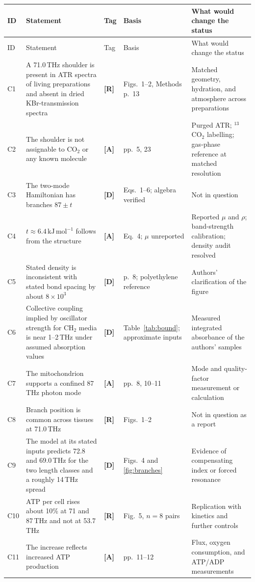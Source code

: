 \documentclass[11pt]{article}
\newcommand{\stR}{\textbf{\textcolor{blue!55!black}{[R]}}}
\newcommand{\stA}{\textbf{\textcolor{orange!70!black}{[A]}}}
\newcommand{\stD}{\textbf{\textcolor{green!40!black}{[D]}}}
\newcommand{\kjm}{\,\mathrm{kJ\,mol^{-1}}}
\theoremstyle{plain}
\theoremstyle{definition}
\theoremstyle{remark}
\begin{document}
\begingroup
\small
\begin{longtable}{@{}p{0.5cm}p{4.6cm}p{0.8cm}p{3.3cm}p{3.4cm}@{}}
\toprule
ID & Statement & Tag & Basis & What would change the status \\
\midrule
\endfirsthead
\toprule
ID & Statement & Tag & Basis & What would change the status \\
\midrule
\endhead
C1 & A 71.0\,THz shoulder is present in ATR spectra of living preparations and absent in dried KBr-transmission spectra & \stR & Figs.~1--2, Methods p.~13 & Matched geometry, hydration, and atmosphere across preparations \\
C2 & The shoulder is not assignable to CO$_2$ or any known molecule & \stA & pp.~5, 23 & Purged ATR; $^{13}$CO$_2$ labelling; gas-phase reference at matched resolution \\
C3 & The two-mode Hamiltonian has branches $87\pm t$ & \stD & Eqs.~1--6; algebra verified & Not in question \\
C4 & $t\approx6.4\kjm$ follows from the structure & \stA & Eq.~4; $\mu$ unreported & Reported $\mu$ and $\rho$; band-strength calibration; density audit resolved \\
C5 & Stated density is inconsistent with stated bond spacing by about $8\times10^{3}$ & \stD & p.~8; polyethylene reference & Authors' clarification of the figure \\
C6 & Collective coupling implied by oscillator strength for CH$_2$ media is near 1--2\,THz under assumed absorption values & \stD & Table~\ref{tab:bound}; approximate inputs & Measured integrated absorbance of the authors' samples \\
C7 & The mitochondrion supports a confined 87\,THz photon mode & \stA & pp.~8, 10--11 & Mode and quality-factor measurement or calculation \\
C8 & Branch position is common across tissues at 71.0\,THz & \stR & Figs.~1--2 & Not in question as a report \\
C9 & The model at its stated inputs predicts 72.8 and 69.0\,THz for the two length classes and a roughly 14\,THz spread & \stD & Figs.~4 and \ref{fig:branches} & Evidence of compensating index or forced resonance \\
C10 & ATP per cell rises about 10\% at 71 and 87\,THz and not at 53.7\,THz & \stR & Fig.~5, $n=8$ pairs & Replication with kinetics and further controls \\
C11 & The increase reflects increased ATP production & \stA & pp.~11--12 & Flux, oxygen consumption, and ATP/ADP measurements \\

\end{longtable}
\end{document}
